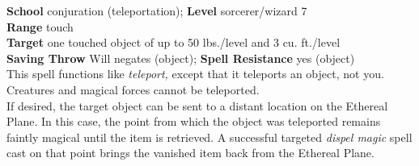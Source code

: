 \textbf{School} conjuration (teleportation); \textbf{Level} sorcerer/wizard 7\\
\textbf{Range} touch\\
\textbf{Target} one touched object of up to 50 lbs./level and 3 cu. ft./level\\
\textbf{Saving Throw }Will negates (object); \textbf{Spell Resistance} yes (object)\\
This spell functions like \textit{teleport, }except that it teleports an object, not you. Creatures and magical forces cannot be teleported.\\
If desired, the target object can be sent to a distant location on the Ethereal Plane. In this case, the point from which the object was teleported remains faintly magical until the item is retrieved. A successful targeted \textit{dispel magic }spell cast on that point brings the vanished item back from the Ethereal Plane.\\
